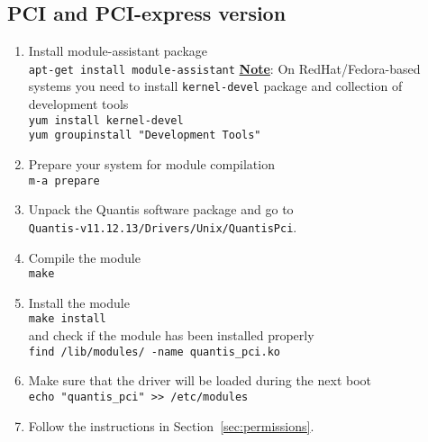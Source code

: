 \documentclass[a4paper,11pt]{article}
\providecommand{\note}[1]{\noindent\textbf{\underline{Note}}: #1\vspace{6pt}}
\newcommand{\QuantisDistVersion}{Quantis-v11.12.13}
\begin{document}
\subsection{PCI and PCI-express version}
\begin{enumerate}
    \item Install module-assistant package\\
    \texttt{apt-get install module-assistant}
    \note{On RedHat/Fedora-based systems you need to install
    \texttt{kernel-devel} package and collection of development tools}\\ 
    \texttt{yum install kernel-devel} \\
    \texttt{yum groupinstall "Development Tools"}

    \item Prepare your system for module compilation\\ \texttt{m-a prepare}

    \item Unpack the Quantis software package and go to\\
    \texttt{\QuantisDistVersion /Drivers/Unix/QuantisPci}.

    \item Compile the module\\ \texttt{make}

    \item Install the module\\ \texttt{make install}\\ and check if the module
    has been installed properly\\ \texttt{find /lib/modules/ -name
    quantis\_pci.ko}

    \item Make sure that the driver will be loaded during the next boot \\
    \texttt{echo "quantis\_pci" >> /etc/modules}

    \item Follow the instructions in Section~\ref{sec:permissions}.

\end{enumerate}

\end{document}
